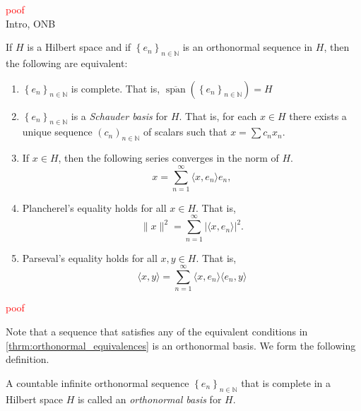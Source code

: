 \documentclass[../thesis.tex]{subfiles}
\begin{document}
\textcolor{red}{poof}\\
Intro, ONB


\begin{theorem}\label{thrm:orthonormal_equivalences}
    If $H$ is a Hilbert space and if $\left\{ e_{n} \right\}_{n\in \mathbb{N}}$ is an orthonormal sequence in $H$,  then the following are equivalent:
    \begin{enumerate}[label=(\alph*)]
        \item \label{eq:oe_a} $\left\{ e_{n} \right\}_{n\in \mathbb{N}}$ is complete. That is, $\overline{\operatorname{span}} \left( \left\{ e_{n} \right\}_{n\in \mathbb{N}} \right) = H$
        
        \item \label{eq:oe_b} $\left\{ e_{n} \right\}_{n\in \mathbb{N}}$ is a \emph{Schauder basis} for $H$. That is, for each $x\in H$ there exists a unique sequence  $(c_n)_{n\in\mathbb{N}}$ of scalars such that $x = \sum c_n x_n$.
        
        \item \label{eq:oe_c} If $x\in H$, then the following series converges in the norm of $H$. \begin{equation} \label{eq:orthonormal_equivalences_3} x=\sum_{n=1}^\infty \langle x,e_n\rangle e_n, \end{equation}
        
        \item \label{eq:oe_d} Plancherel's equality holds for all $x \in H$. That is, $$ \|x \|^2 = \sum_{n=1}^\infty \left| \langle x,e_n \rangle \right|^2.$$
        
        \item \label{eq:oe_e} Parseval's equality holds for all $x,y \in H$. That is, $$ \langle x,y \rangle = \sum_{n=1}^\infty \langle x,e_n \rangle \langle e_n,y \rangle $$
    \end{enumerate}
\end{theorem}

\textcolor{red}{poof}


Note that a sequence that satisfies any of the equivalent conditions in \cref{thrm:orthonormal_equivalences} is an orthonormal basis. We form the following definition.


\begin{definition}
    A countable infinite orthonormal sequence $\left\{ e_{n} \right\}_{n\in \mathbb{N}}$ that is complete in a Hilbert space $H$ is called an \emph{orthonormal basis} for $H$.
\end{definition}
\end{document}
